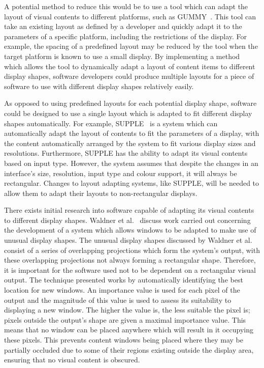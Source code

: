 \documentclass[twocolumn,compsoc]{cvm}
\begin{document}
A potential method to reduce this would be to use a tool which can adapt the layout of visual contents to different platforms, such as GUMMY~\cite{Meskens2008}.
This tool can take an existing layout as defined by a developer and quickly adapt it to the parameters of a specific platform, including the restrictions of the display.
For example, the spacing of a predefined layout may be reduced by the tool when the target platform is known to use a small display.
By implementing a method which allows the tool to dynamically adapt a layout of content items to different display shapes, software developers could produce multiple layouts for a piece of software to use with different display shapes relatively easily.

As opposed to using predefined layouts for each potential display shape, software could be designed to use a single layout which is adapted to fit different display shapes automatically.
For example, SUPPLE~\cite{Gajos2004} is a system which can
automatically adapt the layout of contents to fit the parameters of a display, with the content automatically arranged by the system to fit various display sizes and resolutions.
Furthermore, SUPPLE has the ability to adapt its visual contents based on input type.
However, the system assumes that despite the changes in an interface's size, resolution, input type and colour support, it will always be rectangular.
Changes to layout adapting systems, like SUPPLE, will be needed to allow them to adapt their layouts to non-rectangular displays.

There exists initial research into software capable of adapting its visual contents to different display shapes.
Waldner et al.~\cite{Waldner2011} discuss work carried out concerning the development of a system which allows windows to be adapted to make use of unusual display shapes.
The unusual display shapes discussed by Waldner et al. consist of a series of overlapping projections which form the system's output, with these overlapping projections not always forming a rectangular shape.
Therefore, it is important for the software used not to be dependent on a rectangular visual output.
The technique presented works by automatically identifying the best location for new windows.
An importance value is used for each pixel of the output and the magnitude of this value is used to assess its suitability to displaying a new window.
The higher the value is, the less suitable the pixel is; pixels outside the output's shape are given a maximal importance value.
This means that no window can be placed anywhere which will result in it occupying these pixels.
This prevents content windows being placed where they may be partially occluded due to some of their regions existing outside the display area, ensuring that no visual content is obscured.
\end{document}
